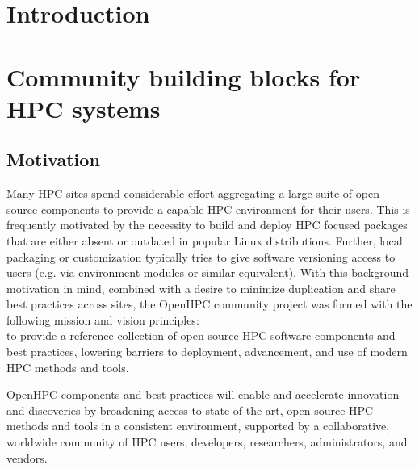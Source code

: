 \documentclass{sig-alternate-05-2015}
\begin{document}

%
%

%
%
\printccsdesc


\section{Introduction}


\section{Community building blocks for HPC systems}

\subsection{Motivation}
Many HPC sites spend considerable effort aggregating a large suite of
open-source components to provide a capable HPC environment for their users.
This is frequently motivated by the necessity to build and deploy HPC focused
packages that are either absent or outdated in popular Linux
distributions. Further, local packaging or customization typically tries to
give software versioning access to users (e.g. via environment modules or
similar equivalent).  With this background motivation in mind, combined with a
desire to minimize duplication and share best practices across sites, the OpenHPC community
project was formed with the following mission and vision principles: \\

 to 
provide a reference collection of open-source HPC software components and
best practices, lowering barriers to deployment, advancement, and use of
modern HPC methods and tools.

 OpenHPC components and best practices will enable and
accelerate innovation and discoveries by broadening access to state-of-the-art,
open-source HPC methods and tools in a consistent environment, supported by a
collaborative, worldwide community of HPC users, developers, researchers,
administrators, and vendors. \\
\end{document}
